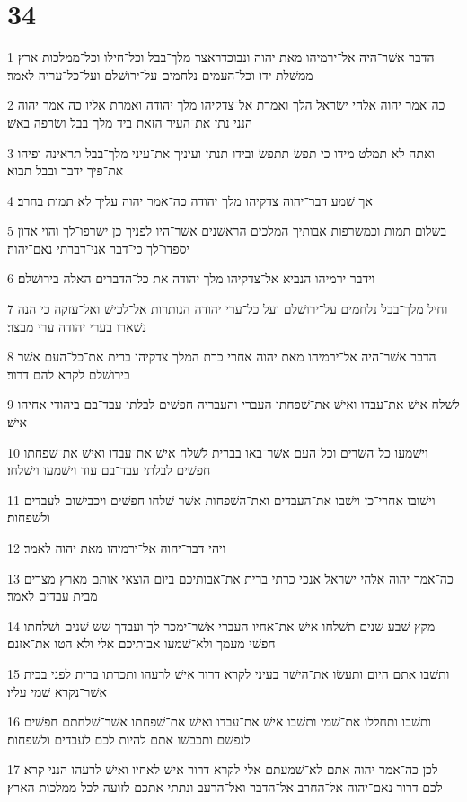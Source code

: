 \chapter{34}

\par 1 הדבר אשׁר־היה אל־ירמיהו מאת יהוה ונבוכדראצר מלך־בבל וכל־חילו וכל־ממלכות ארץ ממשׁלת ידו וכל־העמים נלחמים על־ירושׁלם ועל־כל־עריה לאמר׃
\par 2 כה־אמר יהוה אלהי ישׂראל הלך ואמרת אל־צדקיהו מלך יהודה ואמרת אליו כה אמר יהוה הנני נתן את־העיר הזאת ביד מלך־בבל ושׂרפה באשׁ׃
\par 3 ואתה לא תמלט מידו כי תפשׂ תתפשׂ ובידו תנתן ועיניך את־עיני מלך־בבל תראינה ופיהו את־פיך ידבר ובבל תבוא׃
\par 4 אך שׁמע דבר־יהוה צדקיהו מלך יהודה כה־אמר יהוה עליך לא תמות בחרב׃
\par 5 בשׁלום תמות וכמשׂרפות אבותיך המלכים הראשׁנים אשׁר־היו לפניך כן ישׂרפו־לך והוי אדון יספדו־לך כי־דבר אני־דברתי נאם־יהוה׃
\par 6 וידבר ירמיהו הנביא אל־צדקיהו מלך יהודה את כל־הדברים האלה בירושׁלם׃
\par 7 וחיל מלך־בבל נלחמים על־ירושׁלם ועל כל־ערי יהודה הנותרות אל־לכישׁ ואל־עזקה כי הנה נשׁארו בערי יהודה ערי מבצר׃
\par 8 הדבר אשׁר־היה אל־ירמיהו מאת יהוה אחרי כרת המלך צדקיהו ברית את־כל־העם אשׁר בירושׁלם לקרא להם דרור׃
\par 9 לשׁלח אישׁ את־עבדו ואישׁ את־שׁפחתו העברי והעבריה חפשׁים לבלתי עבד־בם ביהודי אחיהו אישׁ׃
\par 10 וישׁמעו כל־השׂרים וכל־העם אשׁר־באו בברית לשׁלח אישׁ את־עבדו ואישׁ את־שׁפחתו חפשׁים לבלתי עבד־בם עוד וישׁמעו וישׁלחו׃
\par 11 וישׁובו אחרי־כן וישׁבו את־העבדים ואת־השׁפחות אשׁר שׁלחו חפשׁים ויכבישׁום לעבדים ולשׁפחות׃
\par 12 ויהי דבר־יהוה אל־ירמיהו מאת יהוה לאמר׃
\par 13 כה־אמר יהוה אלהי ישׂראל אנכי כרתי ברית את־אבותיכם ביום הוצאי אותם מארץ מצרים מבית עבדים לאמר׃
\par 14 מקץ שׁבע שׁנים תשׁלחו אישׁ את־אחיו העברי אשׁר־ימכר לך ועבדך שׁשׁ שׁנים ושׁלחתו חפשׁי מעמך ולא־שׁמעו אבותיכם אלי ולא הטו את־אזנם׃
\par 15 ותשׁבו אתם היום ותעשׂו את־הישׁר בעיני לקרא דרור אישׁ לרעהו ותכרתו ברית לפני בבית אשׁר־נקרא שׁמי עליו׃
\par 16 ותשׁבו ותחללו את־שׁמי ותשׁבו אישׁ את־עבדו ואישׁ את־שׁפחתו אשׁר־שׁלחתם חפשׁים לנפשׁם ותכבשׁו אתם להיות לכם לעבדים ולשׁפחות׃
\par 17 לכן כה־אמר יהוה אתם לא־שׁמעתם אלי לקרא דרור אישׁ לאחיו ואישׁ לרעהו הנני קרא לכם דרור נאם־יהוה אל־החרב אל־הדבר ואל־הרעב ונתתי אתכם לזועה לכל ממלכות הארץ׃
